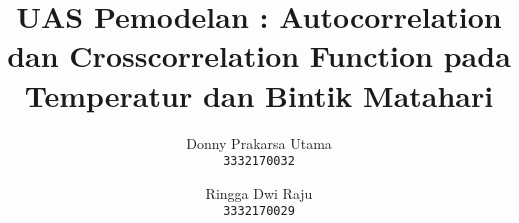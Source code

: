 \documentclass[conference]{IEEEtran}
\begin{document}
\makeatletter
\newcommand{\linebreakand}{%
  \end{@IEEEauthorhalign}
  \hfill\mbox{}\par
  \mbox{}\hfill\begin{@IEEEauthorhalign}
}
\makeatother

\title{UAS Pemodelan : Autocorrelation dan Crosscorrelation Function pada Temperatur dan Bintik Matahari }
\author{Donny Prakarsa Utama\\ \texttt{3332170032}
\and Ringga Dwi Raju\\ \texttt{3332170029} }
\author{
    \and
    }
\maketitle
\end{document}
